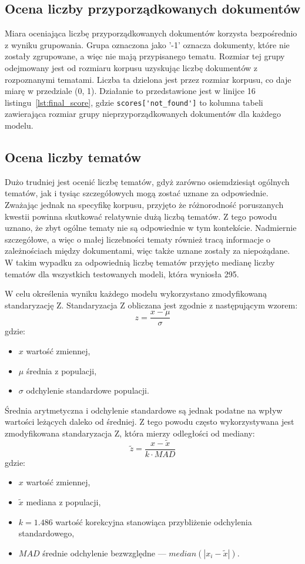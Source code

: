 	\subsection{Ocena liczby przyporządkowanych dokumentów}\label{sec:score_not_found}
		Miara oceniająca liczbę przyporządkowanych dokumentów korzysta bezpośrednio z wyniku grupowania.
		Grupa oznaczona jako '-1' oznacza dokumenty, które nie zostały zgrupowane, a więc nie mają przypisanego tematu.
		Rozmiar tej grupy odejmowany jest od rozmiaru korpusu uzyskując liczbę dokumentów z rozpoznanymi tematami.
		Liczba ta dzielona jest przez rozmiar korpusu, co daje miarę w przedziale (0, 1).
		Działanie to przedstawione jest w linijce 16 listingu~\ref{lst:final_score},
			gdzie \verb|scores['not_found']| to kolumna tabeli zawierająca rozmiar grupy nieprzyporządkowanych dokumentów dla każdego modelu.

	\subsection{Ocena liczby tematów}
		Dużo trudniej jest ocenić liczbę tematów, gdyż zarówno osiemdziesiąt ogólnych tematów,
			jak i tysiąc szczegółowych mogą zostać uznane za odpowiednie.
		Zważając jednak na specyfikę korpusu, przyjęto że różnorodność poruszanych kwestii powinna skutkować relatywnie dużą liczbą tematów.
		Z tego powodu uznano, że zbyt ogólne tematy nie są odpowiednie w tym kontekście.
		Nadmiernie szczegółowe, a więc o małej liczebności tematy również tracą informacje o zależnościach między dokumentami,
			więc także uznane zostały za niepożądane.
		W takim wypadku za odpowiednią liczbę tematów przyjęto medianę liczby tematów dla wszystkich testowanych modeli,
			która wyniosła 295.

		W celu określenia wyniku każdego modelu wykorzystano zmodyfikowaną standaryzację Z.
		Standaryzacja Z obliczana jest zgodnie z następującym wzorem:
		\[z=\frac{x-\mu}{\sigma}\]
		gdzie:
		\begin{itemize}
			\item \(x\) wartość zmiennej,
			\item \(\mu\) średnia z populacji,
			\item \(\sigma\) odchylenie standardowe populacji.
		\end{itemize}
		
		Średnia arytmetyczna i odchylenie standardowe są jednak podatne na wpływ wartości leżących daleko od średniej.
		Z tego powodu często wykorzystywana jest zmodyfikowana standaryzacja Z, która mierzy odległości od mediany:
		\[\tilde{z}=\frac{x-\tilde{x}}{k\cdot MAD}\]
		gdzie:
		\begin{itemize}
			\item \(x\) wartość zmiennej,
			\item \(\tilde{x}\) mediana z populacji,
			\item \(k=1.486\) wartość korekcyjna stanowiąca przybliżenie odchylenia standardowego,
			\item \(MAD\) średnie odchylenie bezwzględne --- \(median\left(|x_i-\tilde{x}|\right)\).
		\end{itemize}


